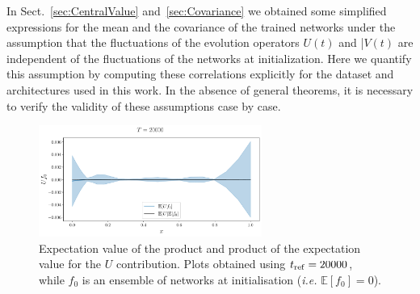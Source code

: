 


In Sect.~\ref{sec:CentralValue} and~\ref{sec:Covariance} we obtained some simplified expressions 
for the mean and the covariance of the trained networks under the assumption that the fluctuations
of the evolution operators $U(t)$ and |$V(t)$ are independent of the fluctuations of the networks 
at initialization. Here we quantify this assumption by computing these correlations explicitly 
for the dataset and architectures used in this work. In the absence of general theorems, it is necessary 
to verify the validity of these assumptions case by case. 

\begin{figure}[t!]
  \label{fig:xT3_exp_val}
  \centering
  \includegraphics[width=0.65\textwidth]{plots/u_v_studies/u_f0_independence_20000_L0.pdf}
  \caption{Expectation value of the product and product of the
  expectation value for the $U$ contribution. Plots obtained using $t_{\rm ref}
  = 20000$, while $f_0$ is an ensemble of networks at initialisation
  (\textit{i.e.} $\mathbb{E}[f_0]=0$).}
\end{figure}
